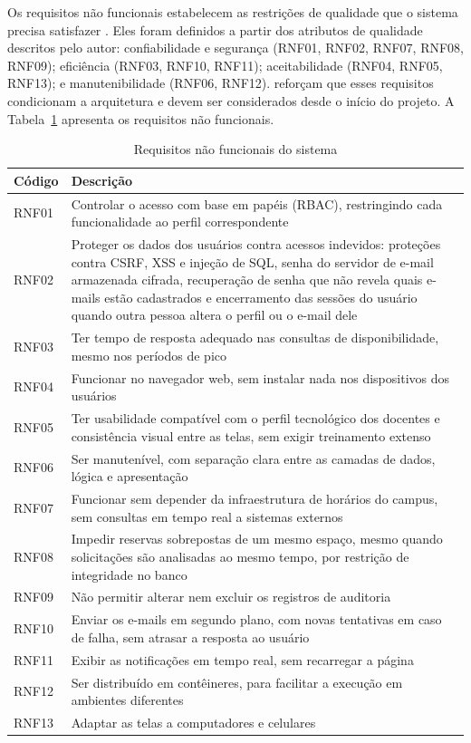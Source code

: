 \documentclass[
	12pt,				%
	twoside,			%
	openany,			%
	a4paper,			%
	chapter=TITLE,		%
	section=TITLE,		%
	subsection=TITLE,	%
	subsubsection=TITLE,%
	english,			%
	french,				%
	spanish,			%
	brazil,				%
	]{abntex2}
\begin{document}
Os requisitos não funcionais estabelecem as restrições de qualidade que o sistema precisa satisfazer \cite{sommerville2018}. Eles foram definidos a partir dos atributos de qualidade descritos pelo autor: confiabilidade e segurança (RNF01, RNF02, RNF07, RNF08, RNF09); eficiência (RNF03, RNF10, RNF11); aceitabilidade (RNF04, RNF05, RNF13); e manutenibilidade (RNF06, RNF12).  reforçam que esses requisitos condicionam a arquitetura e devem ser considerados desde o início do projeto. A Tabela~\ref{tab:rnf} apresenta os requisitos não funcionais.

\begin{table}[!htb]
	\centering
	\caption{Requisitos não funcionais do sistema}
	\begin{tabular}{@{}p{1.8cm}p{12cm}@{}}
	\hline
		\textbf{Código} & \textbf{Descrição} \\ \hline
		RNF01 & Controlar o acesso com base em papéis (RBAC), restringindo cada funcionalidade ao perfil correspondente \\
		RNF02 & Proteger os dados dos usuários contra acessos indevidos: proteções contra CSRF, XSS e injeção de SQL, senha do servidor de e-mail armazenada cifrada, recuperação de senha que não revela quais e-mails estão cadastrados e encerramento das sessões do usuário quando outra pessoa altera o perfil ou o e-mail dele \\
		RNF03 & Ter tempo de resposta adequado nas consultas de disponibilidade, mesmo nos períodos de pico \\
		RNF04 & Funcionar no navegador web, sem instalar nada nos dispositivos dos usuários \\
		RNF05 & Ter usabilidade compatível com o perfil tecnológico dos docentes e consistência visual entre as telas, sem exigir treinamento extenso \\
		RNF06 & Ser manutenível, com separação clara entre as camadas de dados, lógica e apresentação \\
		RNF07 & Funcionar sem depender da infraestrutura de horários do campus, sem consultas em tempo real a sistemas externos \\
		RNF08 & Impedir reservas sobrepostas de um mesmo espaço, mesmo quando solicitações são analisadas ao mesmo tempo, por restrição de integridade no banco \\
		RNF09 & Não permitir alterar nem excluir os registros de auditoria \\
		RNF10 & Enviar os e-mails em segundo plano, com novas tentativas em caso de falha, sem atrasar a resposta ao usuário \\
		RNF11 & Exibir as notificações em tempo real, sem recarregar a página \\
		RNF12 & Ser distribuído em contêineres, para facilitar a execução em ambientes diferentes \\
		RNF13 & Adaptar as telas a computadores e celulares \\ \hline
	\end{tabular}
	\label{tab:rnf}
\end{table}
\end{document}
